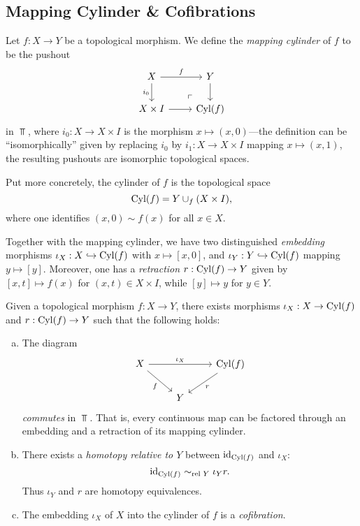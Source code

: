 \subsection{Mapping Cylinder \& Cofibrations}

\begin{definition}
\label{def:mapping-cylinder}
Let \(f: X \to Y\) be a topological morphism. We define the \emph{mapping
  cylinder} of \(f\) to be the pushout
\[
\begin{tikzcd}
X \ar[r, "f"] \ar[d, "i_0"']
\ar[rd, phantom, very near end, "\ulcorner"]
&Y \ar[d] \\
X \times I \ar[r] &\Cyl(f)
\end{tikzcd}
\]
in \(\Top\), where \(i_0: X \to X \times I\) is the morphism
\(x \mapsto (x, 0)\)---the definition can be ``isomorphically'' given by
replacing \(i_0\) by \(i_1: X \to X \times I\) mapping \(x \mapsto (x, 1)\), the
resulting pushouts are isomorphic topological spaces.

Put more concretely, the cylinder of \(f\) is the topological space
\[
\operatorname{Cyl}(f) = Y \cup_f (X \times I),
\]
where one identifies \((x, 0) \sim f(x)\) for all \(x \in X\).

Together with the mapping cylinder, we have two distinguished \emph{embedding}
morphisms \(\iota_X: X \hookrightarrow \operatorname{Cyl}(f)\) with \(x \mapsto [x, 0]\), and
\(\iota_Y: Y \hookrightarrow \operatorname{Cyl}(f)\) mapping \(y \mapsto [y]\). Moreover, one has a
\emph{retraction}  \(r: \operatorname{Cyl}(f) \to Y\) given by \([x, t] \mapsto f(x)\) for
\((x, t) \in X \times I\), while \([y] \mapsto y\) for \(y \in Y\).
\end{definition}

\begin{theorem}
\label{thm:factorization-morphism-embedding-retraction}
Given a topological morphism \(f: X \to Y\), there exists morphisms
\(\iota_X: X \to \operatorname{Cyl}(f)\) and \(r: \operatorname{Cyl}(f) \to Y\) such that the following
holds:
\begin{enumerate}[(a)]\setlength\itemsep{0em}
\item The diagram
  \[
  \begin{tikzcd}
  X \ar[rr, "\iota_X"] \ar[dr, "f"'] & &\Cyl(f) \ar[ld, "r"] \\
  &Y &
  \end{tikzcd}
  \]
  \emph{commutes} in \(\Top\). That is, every continuous map can be factored
  through an embedding and a retraction of its mapping cylinder.

\item There exists a \emph{homotopy relative to \(Y\)} between \(\operatorname{id}_{\operatorname{Cyl}(f)}\)
  and \(\iota_X\):
  \[
  \operatorname{id}_{\operatorname{Cyl}(f)} \sim_{\text{rel }{Y}} \iota_Y r.
  \]
  Thus \(\iota_Y\) and \(r\) are homotopy equivalences.

\item The embedding \(\iota_X\) of \(X\) into the cylinder of \(f\) is a
  \emph{cofibration}.
\end{enumerate}
\end{theorem}

